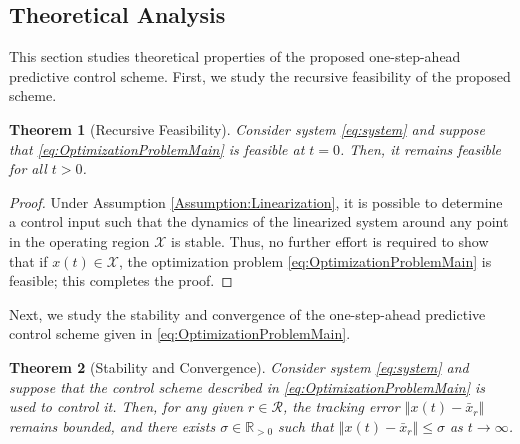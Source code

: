 \documentclass[1p,times]{elsarticle}
\newtheorem{theorem}{Theorem}
\begin{document}
\subsection{Theoretical Analysis}

This section studies theoretical properties of the proposed one-step-ahead predictive control scheme. First, we study the recursive feasibility of the proposed scheme. 



\begin{theorem}[Recursive Feasibility]\label{theorem:feasibility}
Consider system \eqref{eq:system} and suppose that \eqref{eq:OptimizationProblemMain} is feasible at $t=0$. Then, it remains feasible for all $t>0$.
\end{theorem}


\begin{proof}
Under Assumption \ref{Assumption:Linearization}, it is possible to determine a control input such that the dynamics of the linearized system around any point in the operating region $\mathcal{X}$ is stable. Thus, no further effort is required to show that if $x(t)\in\mathcal{X}$, the optimization problem \eqref{eq:OptimizationProblemMain} is feasible; this completes the proof. 
\end{proof}



Next, we study the stability and convergence of the one-step-ahead predictive control scheme given in \eqref{eq:OptimizationProblemMain}. 


\begin{theorem}[Stability and Convergence]\label{theorem:MainController}
Consider system \eqref{eq:system} and suppose that the control scheme described in \eqref{eq:OptimizationProblemMain} is used to control it. Then, for any given $r\in\mathcal{R}$, the tracking error $\left\Vert x(t)-\bar{x}_r\right\Vert$ remains bounded, and there exists $\sigma\in\mathbb{R}_{>0}$ such that $\left\Vert x(t)-\bar{x}_r\right\Vert\leq\sigma$ as $t\rightarrow\infty$. 
\end{theorem}
\end{document}

